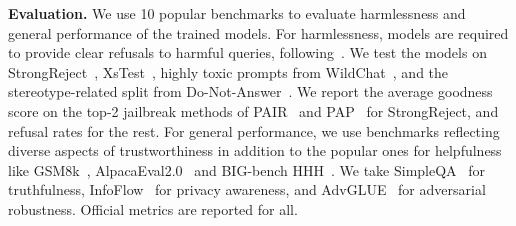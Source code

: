 \textbf{Evaluation.} We use 10 popular benchmarks to evaluate harmlessness and general performance of the trained models. For harmlessness, models are required to provide clear refusals to harmful queries, following~\cite{guan2024deliberative}. We test the models on StrongReject~\cite{souly2024strongreject}, XsTest~\cite{rottger2023xstest}, highly toxic prompts from WildChat~\cite{zhaowildchat}, and the stereotype-related split from Do-Not-Answer~\cite{wang2023not}. We report the average goodness score on the top-2 jailbreak methods of PAIR~\cite{chaojailbreaking} and PAP~\cite{zeng2024johnny} for StrongReject, and refusal rates for the rest. For general performance, we use benchmarks reflecting diverse aspects of trustworthiness in addition to the popular ones for helpfulness like GSM8k~\cite{hendrycks2measuring}, AlpacaEval2.0~\cite{dubois2024length} and BIG-bench HHH~\cite{zhou2024beyond}. We take SimpleQA~\cite{wei2024measuring} for truthfulness, InfoFlow~\cite{mireshghallahcan} for privacy awareness, and AdvGLUE~\cite{wang2adversarial} for adversarial robustness. Official metrics are reported for all.



